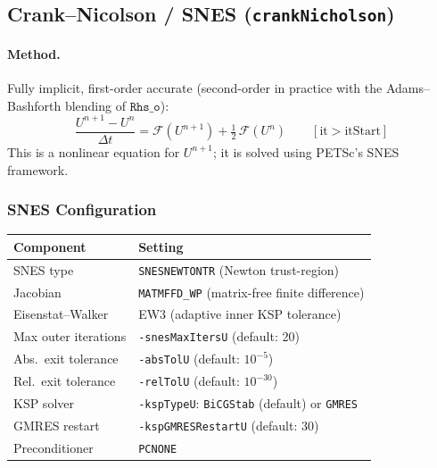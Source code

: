 \documentclass[12pt,a4paper]{article}
\newcommand{\dt}{\Delta t}
\newcommand{\half}{\tfrac{1}{2}}
\begin{document}
	\subsection{Crank--Nicolson / SNES (\texttt{crankNicholson})}
	\label{sec:cranknicholson}
	
	\paragraph{Method.}
	Fully implicit, first-order accurate (second-order in practice with the
	Adams--Bashforth blending of $\texttt{Rhs\_o}$):
	\begin{equation}
		\frac{U^{n+1} - U^n}{\dt}
		= \mathcal{F}(U^{n+1})
		+ \half\, \mathcal{F}(U^n)
		\qquad [\text{it} > \text{itStart}]
		\label{eq:BE}
	\end{equation}
	This is a nonlinear equation for $U^{n+1}$; it is solved using
	PETSc's SNES framework.
	
	\subsubsection{SNES Configuration}
	
	\begin{center}
		\begin{tabular}{ll}
			\toprule
			Component & Setting \\
			\midrule
			SNES type & \texttt{SNESNEWTONTR} (Newton trust-region) \\
			Jacobian  & \texttt{MATMFFD\_WP} (matrix-free finite difference) \\
			Eisenstat--Walker & EW3 (adaptive inner KSP tolerance) \\
			Max outer iterations & \texttt{-snesMaxItersU} (default: 20) \\
			Abs.\ exit tolerance & \texttt{-absTolU} (default: $10^{-5}$) \\
			Rel.\ exit tolerance & \texttt{-relTolU} (default: $10^{-30}$) \\
			\midrule
			KSP solver & \texttt{-kspTypeU}: \texttt{BiCGStab} (default) or \texttt{GMRES} \\
			GMRES restart & \texttt{-kspGMRESRestartU} (default: 30) \\
			Preconditioner & \texttt{PCNONE} \\
			\bottomrule
		\end{tabular}
	\end{center}
	
\end{document}
